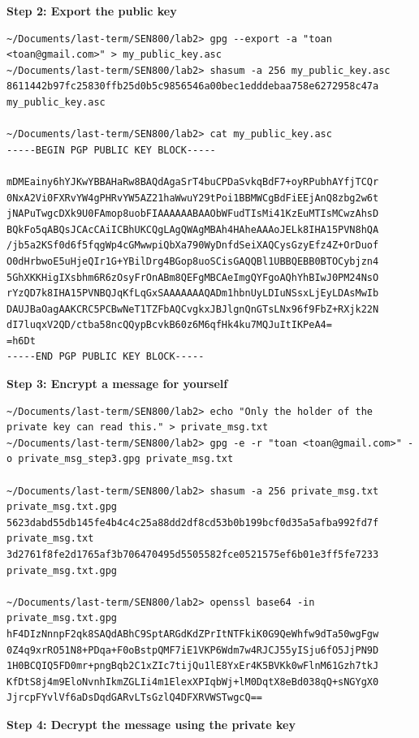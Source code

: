 \documentclass[12pt]{article}
\begin{document}
\textbf{Step 2: Export the public key}

\begin{lstlisting}[style=terminal]
~/Documents/last-term/SEN800/lab2> gpg --export -a "toan <toan@gmail.com>" > my_public_key.asc
~/Documents/last-term/SEN800/lab2> shasum -a 256 my_public_key.asc
8611442b97fc25830ffb25d0b5c9856546a00bec1edddebaa758e6272958c47a  my_public_key.asc

~/Documents/last-term/SEN800/lab2> cat my_public_key.asc
-----BEGIN PGP PUBLIC KEY BLOCK-----

mDMEainy6hYJKwYBBAHaRw8BAQdAgaSrT4buCPDaSvkqBdF7+oyRPubhAYfjTCQr
0NxA2Vi0FXRvYW4gPHRvYW5AZ21haWwuY29tPoi1BBMWCgBdFiEEjAnQ8zbg2w6t
jNAPuTwgcDXk9U0FAmop8uobFIAAAAAABAAObWFudTIsMi41KzEuMTIsMCwzAhsD
BQkFo5qABQsJCAcCAiICBhUKCQgLAgQWAgMBAh4HAheAAAoJELk8IHA15PVN8hQA
/jb5a2KSf0d6f5fqgWp4cGMwwpiQbXa790WyDnfdSeiXAQCysGzyEfz4Z+OrDuof
O0dHrbwoE5uHjeQIr1G+YBilDrg4BGop8uoSCisGAQQBl1UBBQEBB0BTOCybjzn4
5GhXKKHigIXsbhm6R6zOsyFrOnABm8QEFgMBCAeImgQYFgoAQhYhBIwJ0PM24NsO
rYzQD7k8IHA15PVNBQJqKfLqGxSAAAAAAAQADm1hbnUyLDIuNSsxLjEyLDAsMwIb
DAUJBaOagAAKCRC5PCBwNeT1TZFbAQCvgkxJBJlgnQnGTsLNx96f9FbZ+RXjk22N
dI7luqxV2QD/ctba58ncQQypBcvkB60z6M6qfHk4ku7MQJuItIKPeA4=
=h6Dt
-----END PGP PUBLIC KEY BLOCK-----
\end{lstlisting}

\textbf{Step 3: Encrypt a message for yourself}

\begin{lstlisting}[style=terminal]
~/Documents/last-term/SEN800/lab2> echo "Only the holder of the private key can read this." > private_msg.txt
~/Documents/last-term/SEN800/lab2> gpg -e -r "toan <toan@gmail.com>" -o private_msg_step3.gpg private_msg.txt

~/Documents/last-term/SEN800/lab2> shasum -a 256 private_msg.txt private_msg.txt.gpg
5623dabd55db145fe4b4c4c25a88dd2df8cd53b0b199bcf0d35a5afba992fd7f  private_msg.txt
3d2761f8fe2d1765af3b706470495d5505582fce0521575ef6b01e3ff5fe7233  private_msg.txt.gpg

~/Documents/last-term/SEN800/lab2> openssl base64 -in private_msg.txt.gpg
hF4DIzNnnpF2qk8SAQdABhC9SptARGdKdZPrItNTFkiK0G9QeWhfw9dTa50wgFgw
0Z4q9xrRO51N8+PDqa+F0oBstpQMF7iE1VKP6Wdm7w4RJCJ55yISju6fO5JjPN9D
1H0BCQIQ5FD0mr+pngBqb2C1xZIc7tijQu1lE8YxEr4K5BVKk0wFlnM61Gzh7tkJ
KfDtS8j4m9EloNvnhIkmZGLIi4m1ElexXPIqbWj+lM0DqtX8eBd038qQ+sNGYgX0
JjrcpFYvlVf6aDsDqdGARvLTsGzlQ4DFXRVWSTwgcQ==
\end{lstlisting}

\textbf{Step 4: Decrypt the message using the private key}
\end{document}

